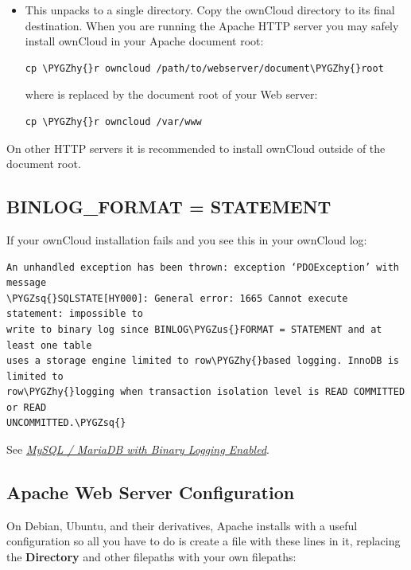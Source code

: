 \documentclass[letterpaper,10pt,english]{sphinxmanual}
\def\PYGZus{\char`\_}
\def\PYGZhy{\char`\-}
\def\PYGZsq{\char`\'}
\begin{document}
\begin{itemize}
\item {} 
This unpacks to a single  directory. Copy the ownCloud directory
to its final destination. When you are running the Apache HTTP server you may
safely install ownCloud in your Apache document root:

\begin{Verbatim}[commandchars=\\\{\}]
cp \PYGZhy{}r owncloud /path/to/webserver/document\PYGZhy{}root
\end{Verbatim}

where  is replaced by the
document root of your Web server:

\begin{Verbatim}[commandchars=\\\{\}]
cp \PYGZhy{}r owncloud /var/www
\end{Verbatim}

\end{itemize}

On other HTTP servers it is recommended to install ownCloud outside of the
document root.


\subsection{BINLOG\_FORMAT = STATEMENT}
\label{installation/source_installation:binlog-format-label}\label{installation/source_installation:binlog-format-statement}
If your ownCloud installation fails and you see this in your ownCloud log:

\begin{Verbatim}[commandchars=\\\{\}]
An unhandled exception has been thrown: exception ‘PDOException’ with message
\PYGZsq{}SQLSTATE[HY000]: General error: 1665 Cannot execute statement: impossible to
write to binary log since BINLOG\PYGZus{}FORMAT = STATEMENT and at least one table
uses a storage engine limited to row\PYGZhy{}based logging. InnoDB is limited to
row\PYGZhy{}logging when transaction isolation level is READ COMMITTED or READ
UNCOMMITTED.\PYGZsq{}
\end{Verbatim}

See {\hyperref[configuration_database/linux_database_configuration:db-binlog-label]{\emph{MySQL / MariaDB with Binary Logging Enabled}}}.


\subsection{Apache Web Server Configuration}
\label{installation/source_installation:apache-web-server-configuration}\label{installation/source_installation:apache-configuration-label}
On Debian, Ubuntu, and their derivatives, Apache installs with a useful
configuration so all you have to do is create a
 file with these lines in
it, replacing the \textbf{Directory} and other filepaths with your own filepaths:
\end{document}
